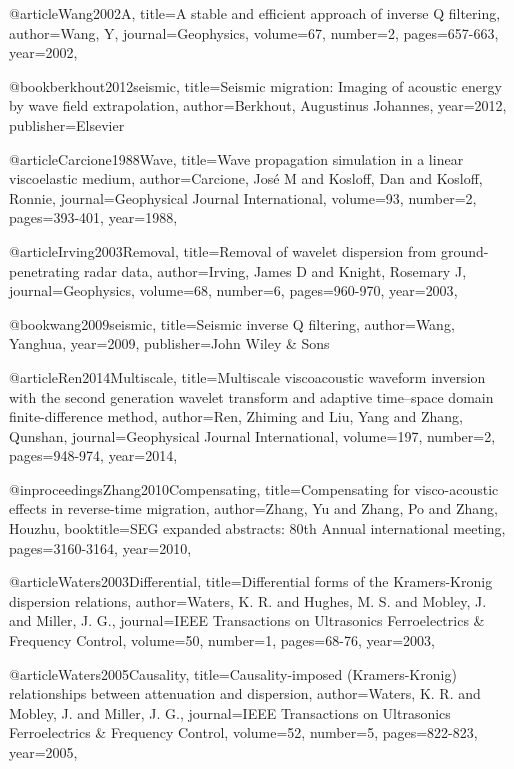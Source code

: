 {@article{Wang2002A,
  title={A stable and efficient approach of inverse {Q} filtering},
  author={Wang, Y},
  journal={Geophysics},
  volume={67},
  number={2},
  pages={657-663},
  year={2002},
}

@book{berkhout2012seismic,
  title={Seismic migration: Imaging of acoustic energy by wave field extrapolation},
  author={Berkhout, Augustinus Johannes},
  year={2012},
  publisher={Elsevier}
}

@article{Carcione1988Wave,
  title={Wave propagation simulation in a linear viscoelastic medium},
  author={Carcione, José M and Kosloff, Dan and Kosloff, Ronnie},
  journal={Geophysical Journal International},
  volume={93},
  number={2},
  pages={393-401},
  year={1988},
}

@article{Irving2003Removal,
  title={Removal of wavelet dispersion from ground-penetrating radar data},
  author={Irving, James D and Knight, Rosemary J},
  journal={Geophysics},
  volume={68},
  number={6},
  pages={960-970},
  year={2003},
}

@book{wang2009seismic,
  title={Seismic inverse {Q} filtering},
  author={Wang, Yanghua},
  year={2009},
  publisher={John Wiley \& Sons}
}

@article{Ren2014Multiscale,
  title={Multiscale viscoacoustic waveform inversion with the second generation wavelet transform and adaptive time–space domain finite-difference method},
  author={Ren, Zhiming and Liu, Yang and Zhang, Qunshan},
  journal={Geophysical Journal International},
  volume={197},
  number={2},
  pages={948-974},
  year={2014},
}

@inproceedings{Zhang2010Compensating,
  title={Compensating for visco-acoustic effects in reverse-time migration},
  author={Zhang, Yu and Zhang, Po and Zhang, Houzhu},
  booktitle={SEG expanded abstracts: 80th Annual international meeting},
  pages={3160-3164},
  year={2010},
}

@article{Waters2003Differential,
  title={Differential forms of the Kramers-Kronig dispersion relations},
  author={Waters, K. R. and Hughes, M. S. and Mobley, J. and Miller, J. G.},
  journal={IEEE Transactions on Ultrasonics Ferroelectrics \& Frequency Control},
  volume={50},
  number={1},
  pages={68-76},
  year={2003},
}

@article{Waters2005Causality,
  title={Causality-imposed (Kramers-Kronig) relationships between attenuation and dispersion},
  author={Waters, K. R. and Mobley, J. and Miller, J. G.},
  journal={IEEE Transactions on Ultrasonics Ferroelectrics \& Frequency Control},
  volume={52},
  number={5},
  pages={822-823},
  year={2005},
}

}
